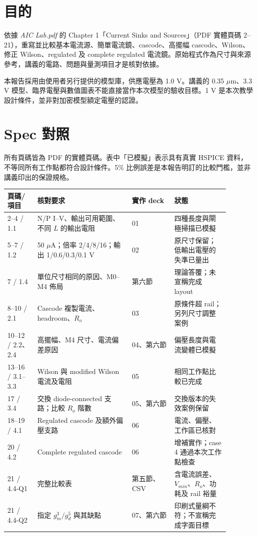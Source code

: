 \section{目的}
依據 \textit{AIC Lab.pdf} 的 Chapter 1「Current Sinks and Sources」（PDF 實體頁碼 2--21），重寫並比較基本電流源、簡單電流鏡、cascode、高擺幅 cascode、Wilson、修正 Wilson、regulated 及 complete regulated 電流鏡。原始程式作為尺寸與來源參考，講義的電路、問題與量測項目才是核對依據。

本報告採用由使用者另行提供的模型庫，供應電壓為 1.0 V。講義的 0.35 $\mu$m、3.3 V 模型、臨界電壓與數值圖表不能直接當作本次模型的驗收目標。1 V 是本次教學設計條件，並非對加密模型額定電壓的認證。

\section{Spec 對照}
所有頁碼皆為 PDF 的實體頁碼。表中「已模擬」表示具有真實 HSPICE 資料，不等同所有工作點都符合設計條件。5\% 比例誤差是本報告明訂的比較門檻，並非講義印出的保證規格。
\begin{longtable}{p{0.12\linewidth}p{0.38\linewidth}p{0.17\linewidth}p{0.22\linewidth}}
\toprule
頁碼/項目 & 核對要求 & 實作 deck & 狀態 \\
\midrule\endhead
2--4 / 1.1 & N/P I--V、輸出可用範圍、不同 $L$ 的輸出電阻 & 01 & 四種長度與閘極掃描已模擬 \\
5--7 / 1.2 & 50 $\mu$A；倍率 2/4/8/16；輸出 1/0.6/0.3/0.1 V & 02 & 原尺寸保留；低輸出電壓的失準已量出 \\
7 / 1.4 & 單位尺寸相同的原因、M0--M4 佈局 & 第六節 & 理論答覆；未宣稱完成 layout \\
8--10 / 2.1 & Cascode 複製電流、headroom、$R_o$ & 03 & 原條件超 rail；另列尺寸調整案例 \\
10--12 / 2.2、2.4 & 高擺幅、M4 尺寸、電流偏差原因 & 04、第六節 & 偏壓長度與電流變體已模擬 \\
13--16 / 3.1--3.3 & Wilson 與 modified Wilson 電流及電阻 & 05 & 相同工作點比較已完成 \\
17 / 3.4 & 交換 diode-connected 支路；比較 $R_o$ 階數 & 05、第六節 & 交換版本的失效案例保留 \\
18--19 / 4.1 & Regulated cascode 及額外偏壓支路 & 06 & 電流、偏壓、工作區已核對 \\
20 / 4.2 & Complete regulated cascode & 06 & 增補實作；case 4 通過本次工作點檢查 \\
21 / 4.4-Q1 & 完整比較表 & 第五節、CSV & 含電流誤差、$V_{min}$、$R_o$、功耗及 rail 裕量 \\
21 / 4.4-Q2 & 指定 $g_m^3/g_d^5$ 與其缺點 & 07、第六節 & 印刷式量綱不符；不宣稱完成字面目標 \\
\bottomrule
\end{longtable}

